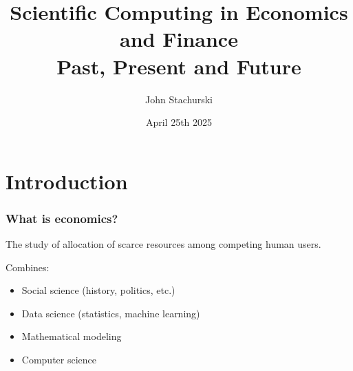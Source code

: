 \documentclass[
    xcolor={svgnames,dvipsnames},
    hyperref={colorlinks, citecolor=DeepPink4, linkcolor=DarkRed, urlcolor=DarkBlue}
    ]{beamer}  %
\title{Scientific Computing in Economics and Finance\\
    Past, Present and Future}
\author{John Stachurski}
\institute{Tokyo College and Australian National University}
\date{April 25th 2025}
\newcommand{\1}{\mathbbm 1}
\begin{document}
\begin{frame}
  \titlepage
\end{frame}





\section{Introduction}


\begin{frame}
    \frametitle{What is economics?}

    The study of allocation of scarce resources among competing 
    human users.

            \vspace{0.3em}
            \vspace{0.3em}
            \vspace{0.3em}
    \pause

    Combines:

    \begin{itemize}
        \item Social science (history, politics, etc.)
            \vspace{0.3em}
            \vspace{0.3em}
            \vspace{0.3em}
        \item Data science (statistics, machine learning)
            \vspace{0.3em}
            \vspace{0.3em}
            \vspace{0.3em}
        \item Mathematical modeling
            \vspace{0.3em}
            \vspace{0.3em}
            \vspace{0.3em}
        \item Computer science
    \end{itemize}


\end{frame}
\end{document}
